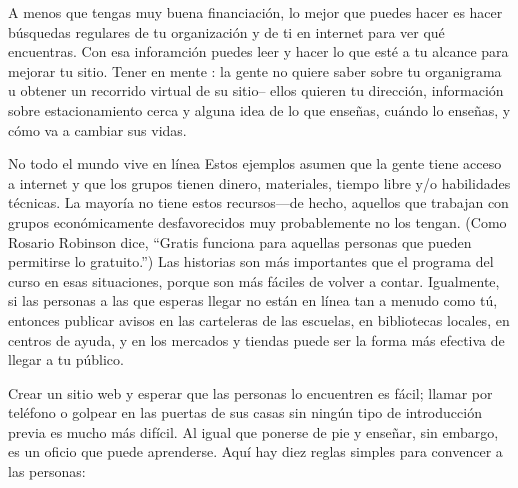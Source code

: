 A menos que tengas muy buena financiación,
lo mejor que puedes hacer es hacer búsquedas regulares de tu organización y de ti en internet 
para ver qué encuentras.
Con esa inforamción puedes leer 
y hacer lo que esté a tu alcance para mejorar tu sitio.
Tener en mente :
la gente no quiere saber sobre tu organigrama u obtener un recorrido virtual de su sitio-- ellos quieren tu dirección,
información sobre estacionamiento cerca 
y alguna idea de lo que enseñas,
cuándo lo enseñas,
y cómo va a cambiar sus vidas.


\begin{aside}{No todo el mundo vive en línea}
Estos ejemplos asumen que la gente tiene acceso a internet y que los grupos 
tienen dinero, materiales, tiempo libre y/o habilidades técnicas.
La mayoría no tiene estos recursos---de hecho,
aquellos que trabajan con grupos económicamente desfavorecidos muy probablemente no los tengan.
(Como Rosario Robinson dice, ``Gratis funciona para aquellas personas que pueden permitirse lo gratuito.'')
Las historias son más importantes que el programa del curso en esas situaciones,
porque son más fáciles de volver a contar.
Igualmente,
si las personas a las que esperas llegar no están en línea tan a menudo como tú,
entonces publicar avisos en las carteleras de las escuelas,
en bibliotecas locales,
en centros de ayuda,
y en los mercados y tiendas puede ser la forma más efectiva de llegar a tu público.
\end{aside}



Crear un sitio web y esperar que las personas lo encuentren es fácil;
llamar por teléfono o golpear en las puertas de sus casas sin ningún tipo de introducción previa es mucho más difícil.
Al igual que ponerse de pie y enseñar,
sin embargo, es un oficio que puede aprenderse.
 Aquí hay diez reglas simples para convencer a las personas:

